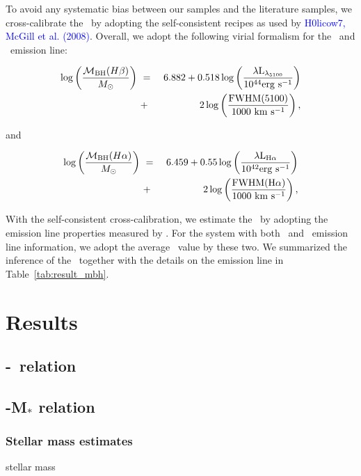 \documentclass[apj]{emulateapj}
\begin{document}
To avoid any systematic bias between our samples and the literature samples, we cross-calibrate the \mbh\ by adopting the self-consistent recipes as used by \textcolor{blue}{H0licow7, McGill et al. (2008)}. Overall, we adopt the following virial formalism for the \halpha\ and \hbeta\ emission line:

\begin{eqnarray}
\label{eq:Hb}
\log \left(\frac{\mathcal M_{\rm BH}(H\beta) }{M_{\odot}}\right)&~=~& 6.882+0.518\log \left(\frac{ \lambda \rm L _{\lambda_{5100}}}{10^{44}{\rm erg~s^{-1}}}\right) \nonumber\\
&~+~& 2 \log \left(\frac{\rm FWHM(5100)}{1000 ~{\rm km~s^{-1}}}\right) , 
\end {eqnarray}

and

\begin{eqnarray}
\label{eq:Ha}
\log \left(\frac{\mathcal M_{\rm BH} (H\alpha)}{M_{\odot}}\right)&~=~& 6.459+0.55 \log \left(\frac{ \lambda \rm L _{H\alpha}}{10^{42}{\rm erg~s^{-1}}}\right) \nonumber\\
&~+~& 2 \log \left(\frac{\rm FWHM(H\alpha)}{1000 ~{\rm km~s^{-1}}}\right) , 
\end {eqnarray}

With the self-consistent cross-calibration, we estimate the \mbh\ by adopting the emission line properties measured by \citet{Schulze2018}. For the system with both \halpha\ and \hbeta\ emission line information, we adopt the average \mbh\ value by these two. We summarized the inference of the \mbh\ together with the details on the emission line in Table~\ref{tab:result_mbh}.


\section{Results}
\label{sec:result}
\subsection{\mbh-\lhost\ relation}

\subsection{\mbh-M$_*$ relation}
\subsubsection{Stellar mass estimates}
stellar mass \\
\end{document}
